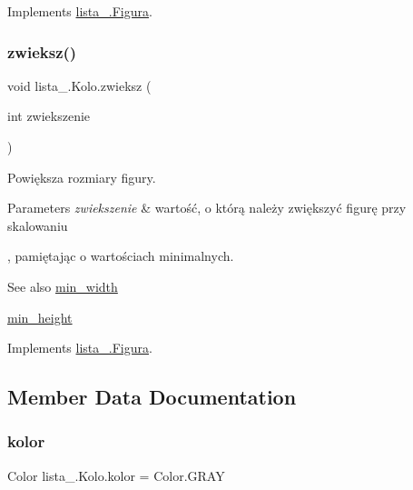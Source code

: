 Implements \mbox{\hyperlink{interfacelista__5_1_1_figura_aeb0982dc44348dd1fde9266d9d476ed0}{lista\+\_.\+Figura}}.

\mbox{\label{classlista__5_1_1_kolo_a045124cf2c42238baba9ba097c2f5af2}} 
\subsubsection{\texorpdfstring{zwieksz()}{zwieksz()}}
{\footnotesize\ttfamily void lista\+\_.\+Kolo.\+zwieksz (\begin{DoxyParamCaption}\item[{int}]{zwiekszenie }\end{DoxyParamCaption})}

Powiększa rozmiary figury. 
\begin{DoxyParams}{Parameters}
{\em zwiekszenie} & wartość, o którą należy zwiększyć figurę przy skalowaniu\\
\hline
\end{DoxyParams}
, pamiętając o wartościach minimalnych. \begin{DoxySeeAlso}{See also}
\mbox{\hyperlink{classlista__5_1_1_kolo_aed784d027c521026966005272339b054}{min\+\_\+width}} 

\mbox{\hyperlink{classlista__5_1_1_kolo_a47a917d7de6905904717534ccd188037}{min\+\_\+height}} 
\end{DoxySeeAlso}


Implements \mbox{\hyperlink{interfacelista__5_1_1_figura_a6813d7ac31e5118bcb34b9b29868ce5f}{lista\+\_.\+Figura}}.



\subsection{Member Data Documentation}
\mbox{\label{classlista__5_1_1_kolo_ae42f8858e1a2278cc04b3190a2ee9fcb}} 
\subsubsection{\texorpdfstring{kolor}{kolor}}
{\footnotesize\ttfamily Color lista\+\_.\+Kolo.\+kolor = Color.\+G\+R\+AY\hspace{0.3cm}{\ttfamily [private]}}


